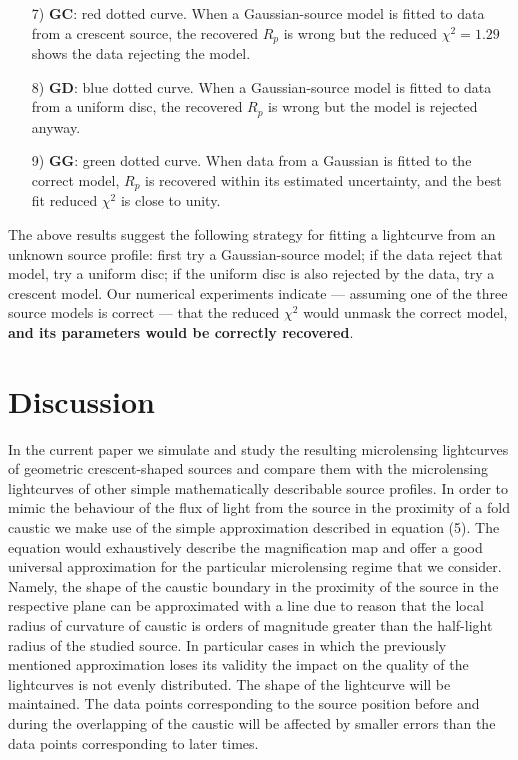 \documentclass[usenatbib]{mn2e}
\begin{document}
\begin{enumerate}

\item[7) {\bf GC}:] red dotted curve.  When a Gaussian-source model is
  fitted to data from a crescent source, the recovered $R_p$ is wrong
  but the reduced $\chi^2=1.29$ shows the data rejecting the model.

\item[8) {\bf GD}:] blue dotted curve.  When a Gaussian-source model
  is fitted to data from a uniform disc, the recovered $R_p$ is wrong
  but the model is rejected anyway.

\item[9) {\bf GG}:] green dotted curve.  When data from a Gaussian is
  fitted to the correct model, $R_p$ is recovered within its estimated
  uncertainty, and the best fit reduced $\chi^2$ is close to unity.

\end{enumerate}

The above results suggest the following strategy for fitting a
lightcurve from an unknown source profile: first try a Gaussian-source
model; if the data reject that model, try a uniform disc; if the
uniform disc is also rejected by the data, try a crescent model.  Our
numerical experiments indicate --- assuming one of the three source
models is correct --- that the reduced $\chi^2$ would unmask the
correct model, \textbf{and its parameters would be correctly recovered}.

\section{Discussion}\label{sec:discussion}

In the current paper we simulate and study the resulting microlensing lightcurves of geometric crescent-shaped sources 
and compare them with the microlensing lightcurves of other simple mathematically describable source profiles. 
In order to mimic the behaviour of the flux of light from the source in the proximity of a fold caustic we make use of the simple approximation described in equation (5). 
The equation would exhaustively describe the magnification map and offer a good universal approximation for the 
particular microlensing regime that we consider. 
Namely, the shape of the caustic boundary in the proximity of the source in the respective plane can be approximated with
 a line due to reason that the local radius of curvature of caustic is orders of magnitude greater than the half-light
 radius of the studied source. 
In particular cases in which the previously mentioned approximation loses its validity the impact on the quality of the 
lightcurves is not evenly distributed. The shape of the lightcurve will be maintained. 
The data points corresponding to the source position before and during the overlapping of the caustic will be affected by
 smaller errors than the data points corresponding to later times. \\
\end{document}
